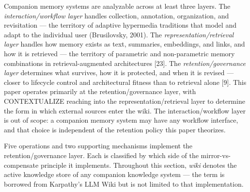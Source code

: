 \documentclass[
  11pt,
]{article}
\begin{document}
Companion memory systems are analyzable across at least three layers.
The \emph{interaction/workflow layer} handles collection, annotation,
organization, and revisitation --- the territory of adaptive hypermedia
traditions that model and adapt to the individual user (Brusilovsky,
2001). The \emph{representation/retrieval layer} handles how memory
exists as text, summaries, embeddings, and links, and how it is
retrieved --- the territory of parametric and non-parametric memory
combinations in retrieval-augmented architectures {[}23{]}. The
\emph{retention/governance layer} determines what survives, how it is
protected, and when it is revised --- closer to lifecycle control and
architectural fitness than to retrieval alone {[}9{]}. This paper
operates primarily at the retention/governance layer, with CONTEXTUALIZE
reaching into the representation/retrieval layer to determine the form
in which external sources enter the wiki. The interaction/workflow layer
is out of scope: a companion memory system may have any workflow
interface, and that choice is independent of the retention policy this
paper theorizes.

Five operations and two supporting mechanisms implement the
retention/governance layer. Each is classified by which side of the
mirror-vs-compensate principle it implements. Throughout this section,
\emph{wiki} denotes the active knowledge store of any companion
knowledge system --- the term is borrowed from Karpathy's LLM Wiki but
is not limited to that implementation.
\end{document}
